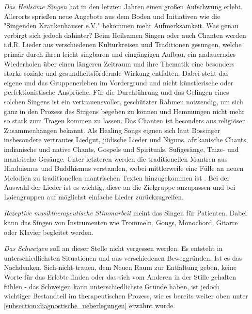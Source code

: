 \emph{Das Heilsame Singen} hat in den letzten Jahren einen großen Aufschwung erlebt. Allerorts sprießen neue Angebote aus dem Boden und Initiativen wie die "Singenden Krankenhäuser e.V." bekommen mehr Aufmerksamkeit. Was genau verbirgt sich jedoch dahinter? Beim Heilsamen Singen oder auch Chanten werden i.d.R. Lieder aus verschiedenen Kulturkreisen und Traditionen gesungen, welche primär durch ihren leicht singbaren und eingängigen Aufbau, ein andauerndes Wiederholen über einen längeren Zeitraum und ihre Thematik eine besonders starke soziale und gesundheitsfördernde Wirkung entfalten. Dabei steht das eigene und das Gruppenerleben im Vordergrund und nicht künstlerische oder perfektionistische Ansprüche. Für die Durchführung und das Gelingen eines solchen Singens ist ein vertrauensvoller, geschützter Rahmen notwendig, um sich ganz in den Prozess des Singens begeben zu können und Hemmungen nicht mehr so stark zum Tragen kommen zu lassen. Das Chanten ist besonders aus religiösen Zusammenhängen bekannt. Als Healing Songs eignen sich laut Bossinger insbesondere vertrautes Liedgut, jüdische Lieder und Niguns, afrikanische Chants, indianische und native Chants, Gospels und Spirituals, Sufigesänge, Taize- und mantrische Gesänge. Unter letzteren werden die traditionellen Mantren aus Hinduismus und Buddhismus verstanden, wobei mittlerweile eine Fülle an neuen Melodien zu traditionellen mantrischen Texten hinzugekommen ist \autocite[vgl.][266 ff.]{bossinger2006}. Bei der Auswahl der Lieder ist es wichtig, diese an die Zielgruppe anzupassen und bei Laiengruppen auf möglichst einfache Lieder zurückzugreifen.

\emph{Rezeptive musiktherapeutische Stimmarbeit} meint das Singen für Patienten. Dabei kann das Singen von Instrumenten wie Trommeln, Gongs, Monochord, Gitarre oder Klavier begleitet werden. 

\emph{Das Schweigen} soll an dieser Stelle nicht vergessen werden. Es entsteht in unterschiedlichsten Situationen und aus verschiedenen Beweggründen. Ist es das Nachdenken, Sich-nicht-trauen, dem Neuen Raum zur Entfaltung geben, keine Worte für das Erlebte finden oder das sich vom Anderen in der Stille gehalten fühlen - das Schweigen kann unterschiedlichste Gründe haben, ist jedoch wichtiger Bestandteil im therapeutischen Prozess, wie es bereits weiter oben unter \ref{subsection:diagnostische_ueberlegungen} erwähnt wurde.


